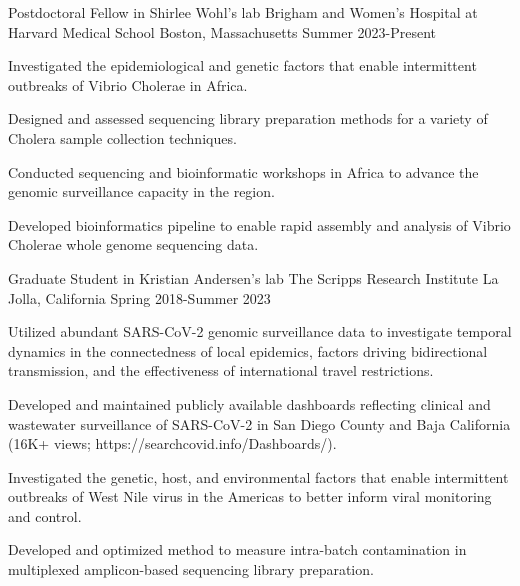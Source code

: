 
\begin{cventries}

  \cventry
    {Postdoctoral Fellow in Shirlee Wohl's lab} %
    {Brigham and Women's Hospital at Harvard Medical School} %
    {Boston, Massachusetts} %
    {Summer 2023-Present} %
    {
      \begin{cvitems} %
        \item {Investigated the epidemiological and genetic factors that enable intermittent outbreaks of Vibrio Cholerae in Africa.}
        \item {Designed and assessed sequencing library preparation methods for a variety of Cholera sample collection techniques.}
        \item {Conducted sequencing and bioinformatic workshops in Africa to advance the genomic surveillance capacity in the region.}

        \item {Developed bioinformatics pipeline to enable rapid assembly and analysis of Vibrio Cholerae whole genome sequencing data.}
      \end{cvitems}
    }

  \cventry
    {Graduate Student in Kristian Andersen's lab} %
    {The Scripps Research Institute} %
    {La Jolla, California} %
    {Spring 2018-Summer 2023} %
    {
      \begin{cvitems} %
        \item {Utilized abundant SARS-CoV-2 genomic surveillance data to investigate temporal dynamics in the connectedness of local epidemics, factors driving bidirectional transmission, and the effectiveness of international travel restrictions.}
        \item {Developed and maintained publicly available dashboards reflecting clinical and wastewater surveillance of SARS-CoV-2 in San Diego County and Baja California (16K+ views; https://searchcovid.info/Dashboards/).}
        \item {Investigated the genetic, host, and environmental factors that enable intermittent outbreaks of West Nile virus in the Americas to better inform viral monitoring and control.}
        \item {Developed and optimized method to measure intra-batch contamination in multiplexed amplicon-based sequencing library preparation.}
      \end{cvitems}
    }


\end{cventries}
